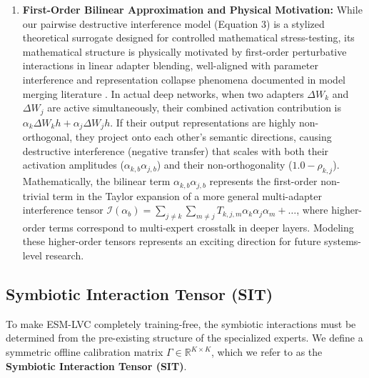 \begin{enumerate}
    \item \textbf{First-Order Bilinear Approximation and Physical Motivation:} While our pairwise destructive interference model (Equation 3) is a stylized theoretical surrogate designed for controlled mathematical stress-testing, its mathematical structure is physically motivated by first-order perturbative interactions in linear adapter blending, well-aligned with parameter interference and representation collapse phenomena documented in model merging literature \cite{yadav2023ties,yu2023dare}. In actual deep networks, when two adapters $\Delta W_k$ and $\Delta W_j$ are active simultaneously, their combined activation contribution is $\alpha_k \Delta W_k h + \alpha_j \Delta W_j h$. If their output representations are highly non-orthogonal, they project onto each other's semantic directions, causing destructive interference (negative transfer) that scales with both their activation amplitudes ($\alpha_{k, b} \alpha_{j, b}$) and their non-orthogonality ($1.0 - \rho_{k, j}$). Mathematically, the bilinear term $\alpha_{k, b} \alpha_{j, b}$ represents the first-order non-trivial term in the Taylor expansion of a more general multi-adapter interference tensor $\mathcal{I}(\alpha_b) = \sum_{j \neq k} \sum_{m \neq j} T_{k,j,m} \alpha_{k} \alpha_{j} \alpha_{m} + \dots$, where higher-order terms correspond to multi-expert crosstalk in deeper layers. Modeling these higher-order tensors represents an exciting direction for future systems-level research.
\end{enumerate}

\subsection{Symbiotic Interaction Tensor (SIT)}
To make ESM-LVC completely training-free, the symbiotic interactions must be determined from the pre-existing structure of the specialized experts. We define a symmetric offline calibration matrix $\Gamma \in \mathbb{R}^{K \times K}$, which we refer to as the \textbf{Symbiotic Interaction Tensor (SIT)}.

